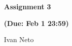 \documentclass{article}
\begin{document}
\rhead{\thepage}

\pagestyle{fancy}

\cfoot{}

\begin{center}

\large{\textbf{Assignment 3}}

\textbf{(Due: Feb 1 23:59)}

Ivan Neto

\end{center}

\vskip 0.2in




\end{document}
